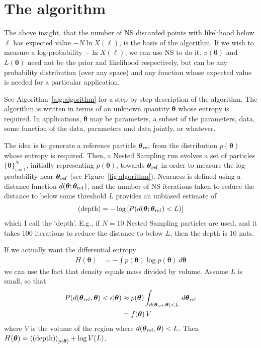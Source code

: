 \documentclass[entropy,article,accept,oneauthor,pdftex,10pt,a4paper]{mdpi}
\newcommand{\x}{\boldsymbol{\theta}}
\newcommand{\depth}{(\textnormal{depth})}
\newcommand{\xref}{\x_{\rm ref}}
\begin{document}
\section{The algorithm}

The above insight, that the number of NS discarded points with likelihood
below $\ell$ has expected value $-N\ln X(\ell)$, is the basis of the algorithm.
If we wish to measure a log-probability $-\ln X(\ell)$, we can use NS to do it.
$\pi(\x)$ and $L(\x)$ need not be the prior and likelihood respectively, but
can be any probability distribution (over any space) and any function whose
expected value is needed for a particular application.

See Algorithm~\ref{alg:algorithm} for a step-by-step description of the
algorithm. The algorithm is written in terms of an unknown quantity $\x$
whose entropy is required. In applications, $\x$ may be parameters,
a subset of the parameters, data, some function of the data,
parameters and data jointly, or whatever.

The idea is to generate a reference particle $\xref$
from the distribution $p(\x)$
whose entropy is required. Then, a Nested Sampling run evolves a set of
particles $\{\x\}_{i=1}^N$, initially representing $p(\x)$,
towards $\xref$ in order to measure the log-probability near
$\xref$ (see Figure~\ref{fig:algorithm}).
Nearness is defined using a distance function
$d(\x; \xref)$, and the number of NS iterations taken to reduce
the distance to below some threshold $L$ provides an unbiased estimate of
\begin{align}
   \depth = -\log \left[ P(d(\x; \xref) < L) \right]
\end{align}
which I call the `depth'. E.g., if $N=10$ Nested Sampling particles are used,
and it takes 100 iterations to reduce the distance to below $L$, then the
depth is 10 nats.

If we actually want the differential entropy
\begin{align}
H(\x) &= -\int p(\x) \log p(\x) \, d\x
\end{align}
we can use the fact that density equals mass divided
by volume. Assume $L$ is small, so that
\begin{align}
P(d(\xref, \x) < \epsilon | \x)
    &\approx
    p(\x) \int_{d(\xref, \x) < L} \, d\xref\\
    &= f(\x) \, V
\end{align}
where $V$ is the volume of the region where $d(\xref, \x) < L$.
Then $H(\x) = \left< \depth \right>_{p(\x)} + \log V(L)$.
\end{document}
